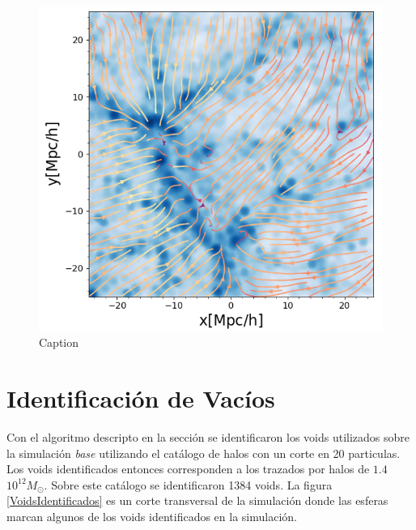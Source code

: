 \begin{figure}
    \centering
    \includegraphics[width=13cm]{Figures/Streamlines.png}
    \caption{Caption}
    \label{Streamlines}
\end{figure}{}

\section{Identificaci\'on de Vac\'ios}

Con el algoritmo descripto en la secci\'on se identificaron los voids utilizados sobre la simulaci\'on \textit{base} utilizando el cat\'alogo de halos con un corte en 20 particulas. Los voids identificados entonces corresponden a los trazados por halos de $1.4$ $10^{12}M_{\odot}$. Sobre este cat\'alogo se identificaron 1384 voids. 
La figura \ref{VoidsIdentificados} es un corte transversal de la simulaci\'on donde las esferas marcan algunos de los voids identificados en la simulaci\'on. 

